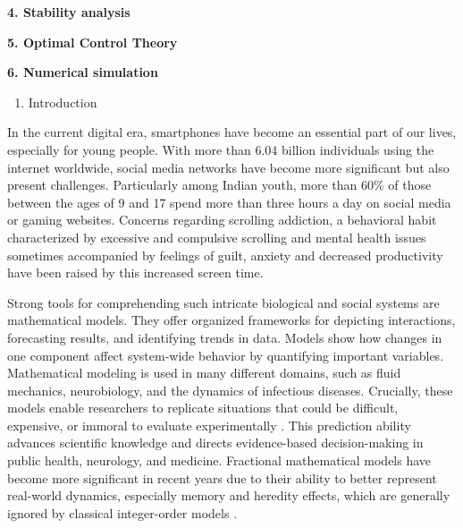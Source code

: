 \documentclass[10pt]{NSP1}
\begin{document}
\par\vspace{14.0pt}\noindent \begin{center}\large\bfseries 4. Stability analysis\end{center}\vspace{14.0pt}

\par\medskip\noindent \begin{center}\normalsize\bfseries 5. Optimal Control Theory\end{center}\smallskip

\par\vspace{14.0pt}\noindent \begin{center}\large\bfseries 6. Numerical simulation\end{center}\vspace{14.0pt}

\par\medskip{}\vspace{14.0pt}

\begin{enumerate}
  \item Introduction
\end{enumerate}

In the current digital era, smartphones have become an essential part of our lives, especially for young people. With more than 6.04 billion individuals using the internet worldwide, social media networks have become more significant but also present challenges. Particularly among Indian youth, more than 60\% of those between the ages of 9 and 17 spend more than three hours a day on social media or gaming websites. Concerns regarding scrolling addiction, a behavioral habit characterized by excessive and compulsive scrolling and mental health issues sometimes accompanied by feelings of guilt, anxiety and decreased productivity have been raised by this increased \cite{ref1, ref2, ref3, ref4, ref5, ref6, ref7, ref8, ref9, ref10} screen time.

Strong tools for comprehending such intricate biological and social systems are mathematical models. They offer organized frameworks for depicting interactions, forecasting results, and identifying trends in data. Models show how changes in one component affect system-wide behavior by quantifying important variables. Mathematical modeling is used in many different domains, such as fluid mechanics, neurobiology, and the dynamics of infectious diseases. Crucially, these models enable researchers to replicate situations that could be difficult, expensive, or immoral to evaluate experimentally \cite{ref11, ref12, ref13, ref14}. This prediction ability advances scientific knowledge and directs evidence-based decision-making in public health, neurology, and medicine. Fractional mathematical models have become more significant in recent years due to their ability to better represent real-world dynamics, especially memory and heredity effects, which are generally ignored by classical integer-order models \cite{ref8, ref11}.
\end{document}
